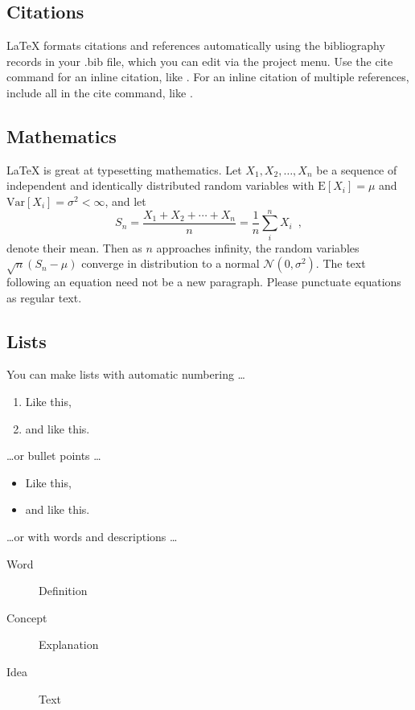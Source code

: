 \documentclass[article,accept,moreauthors,pdftex]{Definitions/TESEA}
\begin{document}
\subsection{Citations}

LaTeX formats citations and references automatically using the bibliography records in your .bib file, which you can edit via the project menu. Use the cite command for an inline citation, like \cite{Norena2020}. For an inline citation of multiple references, include all in the cite command, like \cite{Norena2020,dhivya2021demand}.

\subsection{Mathematics}

\LaTeX{} is great at typesetting mathematics. Let $X_1, X_2, \ldots, X_n$ be a sequence of independent and identically distributed random variables with $\text{E}[X_i] = \mu$ and $\text{Var}[X_i] = \sigma^2 < \infty$, and let
% 
\begin{equation}
S_n = \frac{X_1 + X_2 + \cdots + X_n}{n}
      = \frac{1}{n}\sum_{i}^{n} X_i \enspace,    
\end{equation}
% 
denote their mean. Then as $n$ approaches infinity, the random variables $\sqrt{n}(S_n - \mu)$ converge in distribution to a normal $\mathcal{N}(0, \sigma^2)$. The text following an equation need not be a new paragraph. Please punctuate equations as regular text.

\subsection{Lists}

You can make lists with automatic numbering \dots

\begin{enumerate}[noitemsep] 
\item Like this,
\item and like this.
\end{enumerate}
\dots or bullet points \dots
\begin{itemize}[noitemsep] 
\item Like this,
\item and like this.
\end{itemize}
\dots or with words and descriptions \dots
\begin{description}
\item[Word] Definition
\item[Concept] Explanation
\item[Idea] Text
\end{description}
\end{document}
